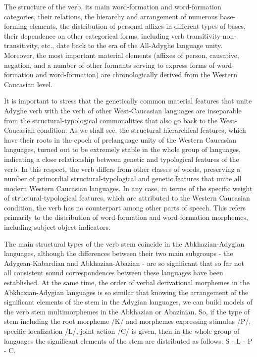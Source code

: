 \documentclass[a4paper,12pt]{book}
\newcommand{\1}[1]{\textbf{\emph{#1}}} %
\newcommand{\2}[1]{\textbf{[#1]}} %
\newcommand{\3}[1]{\fontsize{11pt}{0cm}\textbf{\emph{#1}}} %
\newcommand{\4}[1]{\fontsize{10pt}{0cm}\emph{#1}}	%
\newcommand{\5}[1]{\textbf{/#1/}} %
\newcommand{\6}[1]{\textbf{[#1]}} %
\newcommand{\7}[1]{\fontsize{12pt}{0cm}\emph{#1}} %
\newcommand{\8}[1]{\fontsize{12pt}{0cm}`#1'} %
\newcommand{\9}[1]{\fontsize{12pt}{0cm}(lit. `#1')} %
\begin{document}
The structure of the verb, its main word-formation and word-formation categories, their relations, the hierarchy and arrangement of numerous base-forming elements, the distribution of personal affixes in different types of bases, their dependence on other categorical forms, including verb transitivity-non-transitivity, etc., date back to the era of the All-Adyghe language unity. Moreover, the most important material elements (affixes of person, causative, negation, and a number of other formants serving to express forms of word-formation and word-formation) are chronologically derived from the Western Caucasian level.

It is important to stress that the genetically common material features that unite Adyghe verb with the verb of other West-Caucasian languages are inseparable from the structural-typological commonalities that also go back to the West-Caucasian condition. As we shall see, the structural hierarchical features, which have their roots in the epoch of prelanguage unity of the Western Caucasian languages, turned out to be extremely stable in the whole group of languages, indicating a close relationship between genetic and typological features of the verb. In this respect, the verb differs from other classes of words, preserving a number of primordial structural-typological and genetic features that unite all modern Western Caucasian languages. In any case, in terms of the specific weight of structural-typological features, which are attributed to the Western Caucasian condition, the verb has no counterpart among other parts of speech. This refers primarily to the distribution of word-formation and word-formation morphemes, including subject-object indicators.

The main structural types of the verb stem coincide in the Abkhazian-Adygian languages, although the differences between their two main subgroups - the Adygean-Kabardian and Abkhazian-Abazian - are so significant that so far not all consistent sound correspondences between these languages have been established. At the same time, the order of verbal derivational morphemes in the Abkhazian-Adygian languages is so similar that knowing the arrangement of the significant elements of the stem in the Adygian languages, we can build models of the verb stem multimorphemes in the Abkhazian or Abazinian. So, if the type of stem including the root morpheme /K/ and morphemes expressing stimulus /P/, specific localization /L/, joint action /C/ is given, then in the whole group of languages the significant elements of the stem are distributed as follows: S - L - P - C.
\end{document}
